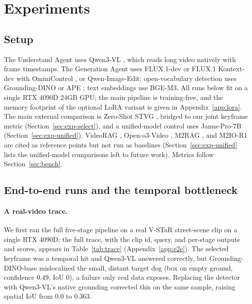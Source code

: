 \documentclass[10pt]{article}
\begin{document}
\section{Experiments}\label{sec:exp}

\subsection{Setup}\label{sec:exp-setup}

The Understand Agent uses Qwen3-VL \citep{qwen3vl2511}, which reads long video natively with frame timestamps. The Generation Agent uses FLUX.1-dev or FLUX.1 Kontext-dev with OminiControl \citep{ominicontrol2411}, or Qwen-Image-Edit; open-vocabulary detection uses Grounding-DINO or APE \citep{videorag2411}; text embeddings use BGE-M3. All runs below fit on a single RTX 4090D 24GB GPU; the main pipeline is training-free, and the memory footprint of the optional LoRA variant is given in Appendix~\ref{app:lora}. The main external comparison is Zero-Shot STVG \citep{zeroshotstvg2509}, bridged to our joint keyframe metric (Section~\ref{sec:exp-select}), and a unified-model control uses Janus-Pro-7B \citep{januspro2501} (Section~\ref{sec:exp-unified}). VideoRAG \citep{videorag2502}, Open-o3-Video \citep{openo3video2510}, M2RAG \citep{m2rag2411}, and M2IO-R1 \citep{m2ior12508} are cited as reference points but not run as baselines (Section~\ref{sec:exp-unified} lists the unified-model comparisons left to future work). Metrics follow Section~\ref{sec:bench}.

\subsection{End-to-end runs and the temporal bottleneck}\label{sec:exp-e2e}

\paragraph{A real-video trace.}
We first ran the full five-stage pipeline on a real V-STaR street-scene clip on a single RTX 4090D; the full trace, with the clip id, query, and per-stage outputs and scores, appears in Table~\ref{tab:trace} (Appendix~\ref{app:e2e}). The selected keyframe was a temporal hit and Qwen3-VL answered correctly, but Grounding-DINO-base mislocalized the small, distant target dog (box on empty ground, confidence 0.49, IoU 0), a failure only real data exposes. Replacing the detector with Qwen3-VL's native grounding corrected this on the same sample, raising spatial IoU from 0.0 to 0.363.
\end{document}
